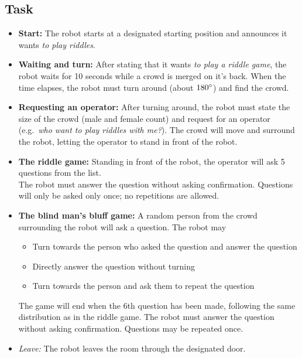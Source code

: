 \subsection{Task}
\begin{itemize}
    \item \textbf{Start:} The robot starts at a designated starting position and announces it wants \textit{to play riddles}.

    \item \textbf{Waiting and turn:} After stating that it wants \textit{to play a riddle game}, the robot waits for 10 seconds while a crowd is merged on it's back. When the time elapses, the robot must turn around (about $180\degree$) and find the crowd.

    \item \textbf{Requesting an operator:} After turning around, the robot must state the size of the crowd (male and female count) and request for an operator (e.g.~\textit{who want to play riddles with me?}). The crowd will move and surround the robot, letting the operator to stand in front of the robot.

    \item \textbf{The riddle game:} Standing in front of the robot, the operator will ask 5 questions from the list.\\
    The robot must answer the question without asking confirmation. Questions will only be asked only once; no repetitions are allowed. 

    \item \textbf{The blind man's bluff game:} A random person from the crowd surrounding the robot will ask a question. The robot may
    \begin{itemize}
        \item Turn towards the person who asked the question and answer the question
        \item Directly answer the question without turning
        \item Turn towards the person and ask them to repeat the question
    \end{itemize}
    The game will end when the 6th question has been made, following the same distribution as in the riddle game. The robot must answer the question without asking confirmation. Questions may be repeated once.

    \item \textit{Leave:} The robot leaves the room through the designated door.
\end{itemize}

